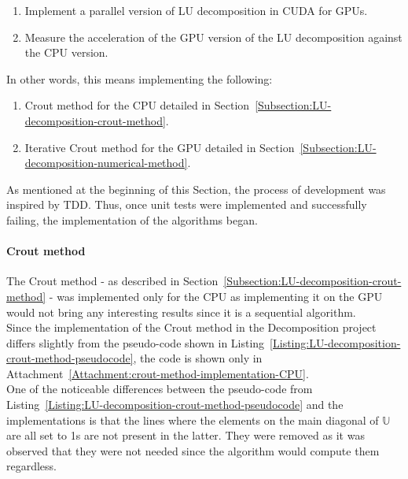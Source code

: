 \begin{enumerate}
	\item Implement a parallel version of LU decomposition in CUDA for GPUs.
	\item Measure the acceleration of the GPU version of the LU decomposition against the CPU version.
\end{enumerate}

In other words, this means implementing the following:

\begin{enumerate}
	\item Crout method for the CPU detailed in Section~\ref{Subsection:LU-decomposition-crout-method}.
	\item Iterative Crout method for the GPU detailed in Section~\ref{Subsection:LU-decomposition-numerical-method}.
\end{enumerate}

As mentioned at the beginning of this Section, the process of development was inspired by TDD. Thus, once unit tests were implemented and successfully failing, the implementation of the algorithms began.

\paragraph{Crout method}\label{Paragraph:implementation-decomposition-project-lu-decomposition-crout-method}
The Crout method - as described in Section~\ref{Subsection:LU-decomposition-crout-method} - was implemented only for the CPU as implementing it on the GPU would not bring any interesting results since it is a sequential algorithm. \\
Since the implementation of the Crout method in the Decomposition project differs slightly from the pseudo-code shown in Listing~\ref{Listing:LU-decomposition-crout-method-pseudocode}, the code is shown only in Attachment~\ref{Attachment:crout-method-implementation-CPU}. \\
One of the noticeable differences between the pseudo-code from Listing~\ref{Listing:LU-decomposition-crout-method-pseudocode} and the implementations is that the lines where the elements on the main diagonal of $ \mathbb{U} $ are all set to 1s are not present in the latter. They were removed as it was observed that they were not needed since the algorithm would compute them regardless.


